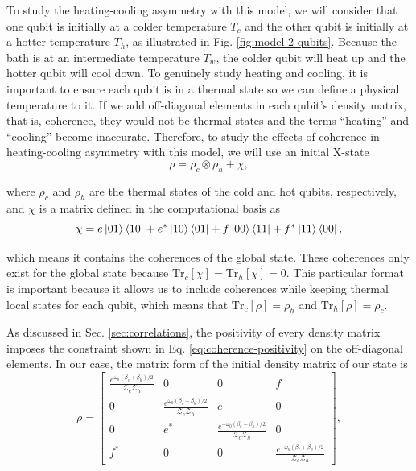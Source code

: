 To study the heating-cooling asymmetry with this model, we will consider that one qubit is initially at a colder temperature $T_c$ and the other qubit is initially at a hotter temperature $T_h$, as illustrated in Fig. \ref{fig:model-2-qubits}. Because the bath is at an intermediate temperature $T_w$, the colder qubit will heat up and the hotter qubit will cool down. To genuinely study heating and cooling, it is important to ensure each qubit is in a thermal state so we can define a physical temperature to it. If we add off-diagonal elements in each qubit's density matrix, that is, coherence, they would not be thermal states and the terms ``heating” and ``cooling” become inaccurate. Therefore, to study the effects of coherence in heating-cooling asymmetry with this model, we will use an initial X-state
\begin{equation}
    \rho = \rho_{c} \otimes \rho_{h} + \chi,
\end{equation}

\noindent where $\rho_c$ and $\rho_h$ are the thermal states of the cold and hot qubits, respectively, and $\chi$ is a matrix defined in the computational basis as
\begin{equation}
    \chi = e \ket{01}\bra{10} + e^* \ket{10}\bra{01} + f \ket{00}\bra{11} + f^* \ket{11}\bra{00},
\end{equation}

\noindent which means it contains the coherences of the global state. These coherences only exist for the global state because $\text{Tr}_c[\chi] = \text{Tr}_h[\chi] = 0$. This particular format is important because it allows us to include coherences while keeping thermal local states for each qubit, which means that $\text{Tr}_c[\rho] = \rho_h$ and $\text{Tr}_h[\rho] = \rho_c$.

As discussed in Sec. \ref{sec:correlations}, the positivity of every density matrix imposes the constraint shown in Eq. \eqref{eq:coherence-positivity} on the off-diagonal elements. In our case, the matrix form of the initial density matrix of our state is
\begin{equation}
    \rho = 
    \begin{bmatrix}
        \frac{e^{\omega_0 (\beta_c + \beta_h)/2}}{\mathcal{Z}_c \mathcal{Z}_h} & 0 & 0 & f\\
        0 & \frac{e^{\omega_0 (\beta_c - \beta_h)/2}}{\mathcal{Z}_c \mathcal{Z}_h} & e & 0\\
        0 & e^* & \frac{e^{-\omega_0 (\beta_c - \beta_h)/2}}{\mathcal{Z}_c \mathcal{Z}_h} & 0\\
        f^* & 0 & 0 & \frac{e^{-\omega_0 (\beta_c + \beta_h)/2}}{\mathcal{Z}_c \mathcal{Z}_h}
    \end{bmatrix},
    \label{eq:initial-rho}
\end{equation}

